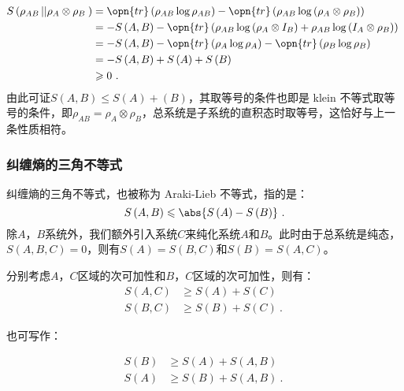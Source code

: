 \begin{equation}
\begin{aligned}
S\left(\rho_{AB}\left|\left|\rho_A\otimes\rho_B\right.\right.\right)&= \opn{tr}\left(\rho_{AB}\log\rho_{AB}\right) - \opn{tr}\left(\rho_{AB}\log\left(\rho_A\otimes\rho_B\right)\right) \\
&= -S\left(A,B\right) - \opn{tr}\left(\rho_{AB}\log\left(\rho_A\otimes I_B\right) + \rho_{AB}\log\left(I_A\otimes\rho_B\right)\right) \\
&= -S\left(A,B\right) - \opn{tr}\left(\rho_A\log\rho_A\right) - \opn{tr}\left(\rho_B\log\rho_B\right) \\
&= -S\left(A,B\right) + S\left(A\right) + S\left(B\right) \\
&\geqslant 0~.
\end{aligned}~
\end{equation}
由此可证$S\left(A,B\right)\leqslant S\left(A\right) + \left(B\right)$，其取等号的条件也即是 klein 不等式取等号的条件，即$\rho_{AB} = \rho_A\otimes \rho_B$，总系统是子系统的直积态时取等号，这恰好与上一条性质相符。

\subsubsection{纠缠熵的三角不等式}

纠缠熵的三角不等式，也被称为 Araki-Lieb 不等式，指的是：
\begin{equation}
S\left(A,B\right)\leqslant\abs{S\left(A\right) - S\left(B\right)}~.
\end{equation}
除$A$，$B$系统外，我们额外引入系统$C$来纯化系统$A$和$B$。此时由于总系统是纯态，$S\left(A,B,C\right) = 0$，则有$S\left(A\right) = S\left(B,C\right)$和$S\left(B\right) = S\left(A,C\right)$。

分别考虑$A$，$C$区域的次可加性和$B$，$C$区域的次可加性，则有：
\begin{equation}
\begin{aligned}
S\left(A,C\right)&\geqslant S\left(A\right)+S\left(C\right) \\
S\left(B,C\right)&\geqslant S\left(B\right)+S\left(C\right)~.
\end{aligned}~
\end{equation}

也可写作：

\begin{equation}
\begin{aligned}
S\left(B\right)&\geqslant S\left(A\right) + S\left(A,B\right) \\
S\left(A\right)&\geqslant S\left(B\right) + S\left(A,B\right)~.
\end{aligned}~
\end{equation}

